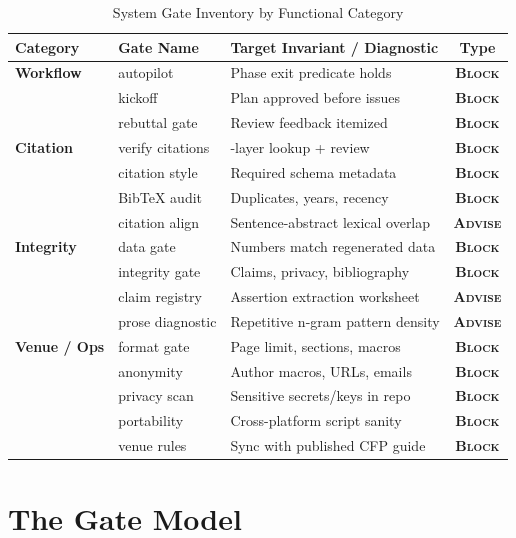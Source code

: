 \documentclass[conference]{IEEEtran}
\newcommand{\badgeblock}{\textsc{\textbf{\textcolor{gatered}{Block}}}}
\newcommand{\badgeadvise}{\textsc{\textbf{\textcolor{gateblue}{Advise}}}}
\begin{document}
\begin{table}[t]
\centering
\caption{System Gate Inventory by Functional Category}
\label{tab:gates}
\renewcommand{\arraystretch}{0.98}
\setlength{\tabcolsep}{2.5pt}
\footnotesize
\begin{tabular}{@{}ll>{\raggedright\arraybackslash}p{3.8cm}c@{}}
\toprule
\textbf{Category} & \textbf{Gate Name} & \textbf{Target Invariant / Diagnostic} & \textbf{Type} \\
\midrule
\rowcolor{rowtint} \textbf{Workflow} & autopilot & Phase exit predicate holds & \badgeblock \\
\rowcolor{rowtint} & kickoff & Plan approved before issues & \badgeblock \\
\rowcolor{rowtint} & rebuttal gate & Review feedback itemized & \badgeblock \\
\midrule
\textbf{Citation} & verify citations & 3-layer lookup + review & \badgeblock \\
& citation style & Required schema metadata & \badgeblock \\
& BibTeX audit & Duplicates, years, recency & \badgeblock \\
& citation align & Sentence-abstract lexical overlap & \badgeadvise \\
\midrule
\rowcolor{rowtint} \textbf{Integrity} & data gate & Numbers match regenerated data & \badgeblock \\
\rowcolor{rowtint} & integrity gate & Claims, privacy, bibliography & \badgeblock \\
\rowcolor{rowtint} & claim registry & Assertion extraction worksheet & \badgeadvise \\
\rowcolor{rowtint} & prose diagnostic & Repetitive n-gram pattern density & \badgeadvise \\
\midrule
\textbf{Venue / Ops} & format gate & Page limit, sections, macros & \badgeblock \\
& anonymity & Author macros, URLs, emails & \badgeblock \\
& privacy scan & Sensitive secrets/keys in repo & \badgeblock \\
& portability & Cross-platform script sanity & \badgeblock \\
& venue rules & Sync with published CFP guide & \badgeblock \\
\bottomrule
\end{tabular}
\end{table}

\section{The Gate Model}
\label{sec:gates}
\end{document}
